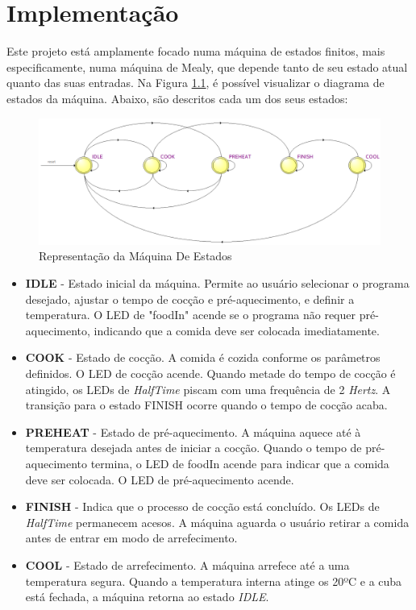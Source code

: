 \documentclass[a4paper, 11pt, onecolumn, oneside]{report}
\begin{document}
\chapter{Implementação}
\label{chap.arquitetura}
Este projeto está amplamente focado numa máquina de estados finitos, mais especificamente, numa máquina de Mealy, que depende tanto de seu estado atual quanto das suas entradas. Na Figura \ref{fig:fsm}, é possível visualizar o diagrama de estados da máquina. Abaixo, são descritos cada um dos seus estados: \\

\begin{figure}[H]
    \centering
    \includegraphics[width=\textwidth]{images/FSM.png}
    \caption{Representação da Máquina De Estados}
    \label{fig:fsm}
\end{figure}

\begin{itemize}
    \item \textbf{IDLE} - Estado inicial da máquina. Permite ao usuário selecionar o programa desejado, ajustar o tempo de cocção e pré-aquecimento, e definir a temperatura. O LED de "foodIn" acende se o programa não requer pré-aquecimento, indicando que a comida deve ser colocada imediatamente.
    
    \item \textbf{COOK} - Estado de cocção. A comida é cozida conforme os parâmetros definidos. O LED de cocção acende. Quando metade do tempo de cocção é atingido, os LEDs de \textit{HalfTime} piscam com uma frequência de 2 \textit{Hertz}. A transição para o estado FINISH ocorre quando o tempo de cocção acaba.

    \item \textbf{PREHEAT} - Estado de pré-aquecimento. A máquina aquece até à temperatura desejada antes de iniciar a cocção. Quando o tempo de pré-aquecimento termina, o LED de foodIn acende para indicar que a comida deve ser colocada. O LED de pré-aquecimento acende. 

    \item \textbf{FINISH} - Indica que o processo de cocção está concluído. Os LEDs de \textit{HalfTime} permanecem acesos. A máquina aguarda o usuário retirar a comida antes de entrar em modo de arrefecimento.

    \item \textbf{COOL} - Estado de arrefecimento. A máquina arrefece até a uma temperatura segura. Quando a temperatura interna atinge os 20ºC e a cuba está fechada, a máquina retorna ao estado \textit{IDLE}.
\end{itemize}
\end{document}
